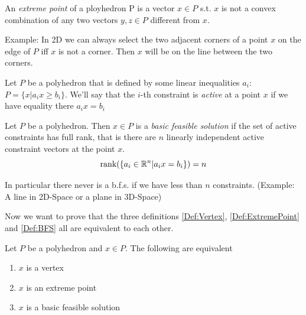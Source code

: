 \begin{Def}\label{Def:ExtremePoint} An \emph{extreme point} of a ployhedron P is a vector $x\in P$ s.t. $x$ is not a convex combination of any two vectors $y,z\in P$ different from $x$. 
\end{Def}
Example: In 2D we can always select the two adjacent corners of a point $x$ on the edge of $P$ iff $x$ is not a corner. Then $x$ will be on the line between the two corners. 

\begin{Def}\label{Def:ActiveConstraint} Let $P$ be a polyhedron that is defined by some linear inequalities $a_i$: $P=\{x|a_ix\geq b_i\}$. We'll say that the $i$-th constraint is \emph{active} at a point $x$ if we have equality there $a_ix = b_i$
\end{Def}

\begin{Def}\label{Def:BFS} Let $P$ be a polyhedron. Then $x\in P$ is a \emph{basic feasible solution} if the set of active constraints has full rank, that is there are $n$ linearly independent active constraint vectors at the point $x$.
\[\mbox{rank}(\{a_i\in \mathbb{R}^n|a_ix=b_i\}) = n\]

In particular there never is a b.f.s. if we have less than $n$ constraints. (Example: A line in 2D-Space or a plane in 3D-Space)
\end{Def}

Now we want to prove that the three definitions \ref{Def:Vertex}, \ref{Def:ExtremePoint} and \ref{Def:BFS} all are equivalent to each other.

\begin{thm} \label{Thm:cornerEquiv} Let $P$ be a polyhedron and $x\in P$. The following are equivalent
\begin{enumerate}
\item $x$ is a vertex
\item $x$ is an extreme point
\item $x$ is a basic feasible solution
\end{enumerate}
\end{thm}

